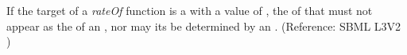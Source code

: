 If the target of a \emph{rateOf}  function is a \Species with a  value of , the  of that \Species must not appear as the  of an \AssignmentRule, nor may its  be determined by an \AlgebraicRule.  (Reference: SBML L3V2 )


